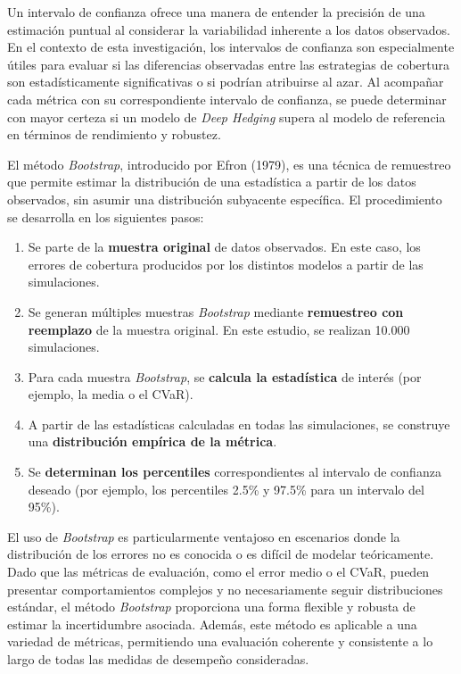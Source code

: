 \documentclass[11pt,a4paper,spanish]{article}
\numberwithin{equation}{section} %
\begin{document}
Un intervalo de confianza ofrece una manera de entender la precisión de una estimación puntual al considerar la variabilidad inherente a los datos observados. En el contexto de esta investigación, los intervalos de confianza son especialmente útiles para evaluar si las diferencias observadas entre las estrategias de cobertura son estadísticamente significativas o si podrían atribuirse al azar. Al acompañar cada métrica con su correspondiente intervalo de confianza, se puede determinar con mayor certeza si un modelo de \textit{Deep Hedging} supera al modelo de referencia en términos de rendimiento y robustez.

El método \textit{Bootstrap}, introducido por Efron (1979), es una técnica de remuestreo que permite estimar la distribución de una estadística a partir de los datos observados, sin asumir una distribución subyacente específica. El procedimiento se desarrolla en los siguientes pasos:

\begin{enumerate}
    \item Se parte de la \textbf{muestra original} de datos observados. En este caso, los errores de cobertura producidos por los distintos modelos a partir de las simulaciones. 
    \item  Se generan múltiples muestras \textit{Bootstrap} mediante \textbf{remuestreo con reemplazo} de la muestra original. En este estudio, se realizan 10.000 simulaciones.
    \item Para cada muestra \textit{Bootstrap}, se \textbf{calcula la estadística} de interés (por ejemplo, la media o el CVaR).
    \item A partir de las estadísticas calculadas en todas las simulaciones, se construye una \textbf{distribución empírica de la métrica}.
    \item Se \textbf{determinan los percentiles} correspondientes al intervalo de confianza deseado (por ejemplo, los percentiles 2.5\% y 97.5\% para un intervalo del 95\%).
\end{enumerate}

El uso de \textit{Bootstrap} es particularmente ventajoso en escenarios donde la distribución de los errores no es conocida o es difícil de modelar teóricamente. Dado que las métricas de evaluación, como el error medio o el CVaR, pueden presentar comportamientos complejos y no necesariamente seguir distribuciones estándar, el método \textit{Bootstrap} proporciona una forma flexible y robusta de estimar la incertidumbre asociada. Además, este método es aplicable a una variedad de métricas, permitiendo una evaluación coherente y consistente a lo largo de todas las medidas de desempeño consideradas.
\end{document}
